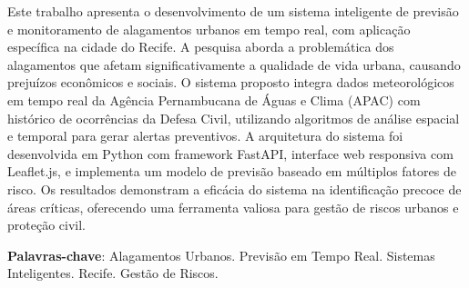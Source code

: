 \begin{resumo}
    Este trabalho apresenta o desenvolvimento de um sistema inteligente de previsão e monitoramento de alagamentos urbanos em tempo real, com aplicação específica na cidade do Recife. A pesquisa aborda a problemática dos alagamentos que afetam significativamente a qualidade de vida urbana, causando prejuízos econômicos e sociais. O sistema proposto integra dados meteorológicos em tempo real da Agência Pernambucana de Águas e Clima (APAC) com histórico de ocorrências da Defesa Civil, utilizando algoritmos de análise espacial e temporal para gerar alertas preventivos. A arquitetura do sistema foi desenvolvida em Python com framework FastAPI, interface web responsiva com Leaflet.js, e implementa um modelo de previsão baseado em múltiplos fatores de risco. Os resultados demonstram a eficácia do sistema na identificação precoce de áreas críticas, oferecendo uma ferramenta valiosa para gestão de riscos urbanos e proteção civil.
    
    \vspace{\onelineskip}
    
    \noindent
    \textbf{Palavras-chave}: Alagamentos Urbanos. Previsão em Tempo Real. Sistemas Inteligentes. Recife. Gestão de Riscos.
\end{resumo}